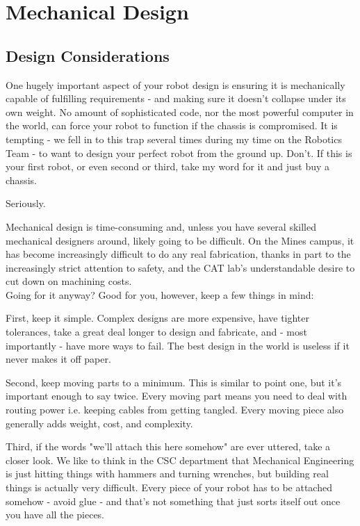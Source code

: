 
\chapter{Mechanical Design}
\label{chap:MechDes}

\section{Design Considerations}
One hugely important aspect of your robot design is ensuring it is mechanically capable of fulfilling requirements - and making sure it doesn't collapse under its own weight. No amount of sophisticated code, nor the most powerful computer in the world, can force your robot to function if the chassis is compromised. It is tempting - we fell in to this trap several times during my time on the Robotics Team - to want to design your perfect robot from the ground up. Don't. If this is your first robot, or even second or third, take my word for it and just buy a chassis.

Seriously.

Mechanical design is time-consuming and, unless you have several skilled mechanical designers around, likely going to be difficult. On the Mines campus, it has become increasingly difficult to do any real fabrication, thanks in part to the increasingly strict attention to safety, and the CAT lab's understandable desire to cut down on machining costs.\\

Going for it anyway? Good for you, however, keep a few things in mind:

First, keep it simple. Complex designs are more expensive, have tighter tolerances, take a great deal longer to design and fabricate, and - most importantly - have more ways to fail. The best design in the world is useless if it never makes it off paper.

Second, keep moving parts to a minimum. This is similar to point one, but it's important enough to say twice. Every moving part means you need to deal with routing power i.e. keeping cables from getting tangled. Every moving piece also generally adds weight, cost, and complexity.

Third, if the words "we'll attach this here somehow" are ever uttered, take a closer look. We like to think in the CSC department that Mechanical Engineering is just hitting things with hammers and turning wrenches, but building real things is actually very difficult. Every piece of your robot has to be attached somehow - avoid glue - and that's not something that just sorts itself out once you have all the pieces.

